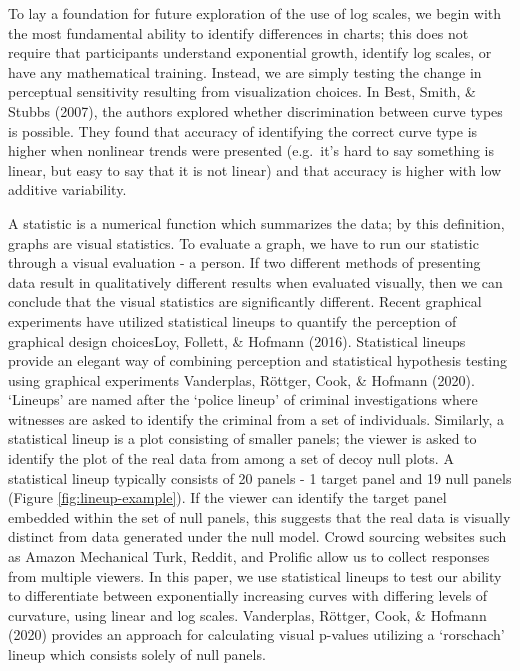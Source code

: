 \documentclass[print]{nuthesis}
\begin{document}
To lay a foundation for future exploration of the use of log scales, we begin with the most fundamental ability to identify differences in charts; this does not require that participants understand exponential growth, identify log scales, or have any mathematical training.
Instead, we are simply testing the change in perceptual sensitivity resulting from visualization choices. In Best, Smith, \& Stubbs (2007), the authors explored whether discrimination between curve types is possible.
They found that accuracy of identifying the correct curve type is higher when nonlinear trends were presented (e.g.~it's hard to say something is linear, but easy to say that it is not linear) and that accuracy is higher with low additive variability.

A statistic is a numerical function which summarizes the data; by this definition, graphs are visual statistics.
To evaluate a graph, we have to run our statistic through a visual evaluation - a person.
If two different methods of presenting data result in qualitatively different results when evaluated visually, then we can conclude that the visual statistics are significantly different.
Recent graphical experiments have utilized statistical lineups to quantify the perception of graphical design choicesLoy, Follett, \& Hofmann (2016).
Statistical lineups provide an elegant way of combining perception and statistical hypothesis testing using graphical experiments Vanderplas, Röttger, Cook, \& Hofmann (2020).
`Lineups' are named after the `police lineup' of criminal investigations where witnesses are asked to identify the criminal from a set of individuals.
Similarly, a statistical lineup is a plot consisting of smaller panels; the viewer is asked to identify the plot of the real data from among a set of decoy null plots.
A statistical lineup typically consists of 20 panels - 1 target panel and 19 null panels (Figure \ref{fig:lineup-example}).
If the viewer can identify the target panel embedded within the set of null panels, this suggests that the real data is visually distinct from data generated under the null model.
Crowd sourcing websites such as Amazon Mechanical Turk, Reddit, and Prolific allow us to collect responses from multiple viewers.
In this paper, we use statistical lineups to test our ability to differentiate between exponentially increasing curves with differing levels of curvature, using linear and log scales. Vanderplas, Röttger, Cook, \& Hofmann (2020) provides an approach for calculating visual p-values utilizing a `rorschach' lineup which consists solely of null panels.
\end{document}
